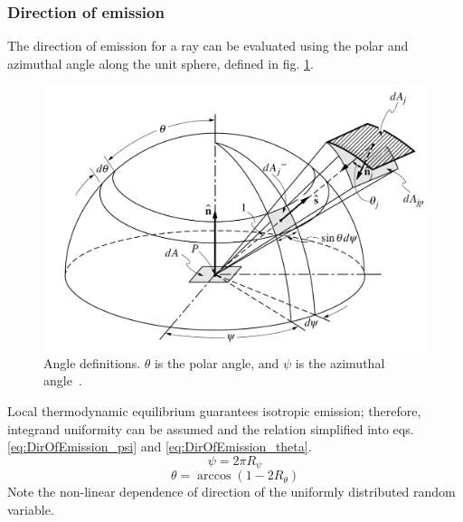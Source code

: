 \subsubsection{Direction of emission}
The direction of emission for a ray can be evaluated using the polar and azimuthal angle along the unit sphere, defined in fig. \ref{fig:Unit_Sphere}. 
\begin{figure}
\includegraphics[width=\linewidth]{figures/ch3/solid_angl.png}
\caption{Angle definitions. $\theta$ is the polar angle, and $\psi$ is the azimuthal angle~\cite{Modest2013RadiativeTransfer}. }
\label{fig:Unit_Sphere}
\end{figure}
Local thermodynamic equilibrium guarantees isotropic emission; therefore, integrand uniformity can be assumed and the relation simplified into eqs. \ref{eq:DirOfEmission_psi} and \ref{eq:DirOfEmission_theta}.
\begin{equation}
    \psi{} = 2\pi{}R_\psi{}
    \label{eq:DirOfEmission_psi}
\end{equation}
\begin{equation}
    \theta{}=\arccos{(1-2R_\theta{})}
    \label{eq:DirOfEmission_theta}
\end{equation}
Note the non-linear dependence of direction of the uniformly distributed random variable.

